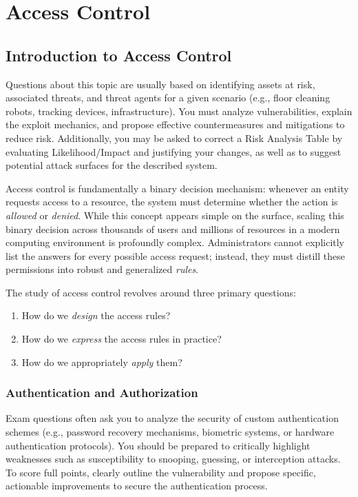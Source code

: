 \chapter{Access Control}
\label{ch:access_control}

\section{Introduction to Access Control}

\begin{tcolorbox}[colback=blue!5!white,colframe=blue!75!black,title=Exam Insight]
Questions about this topic are usually based on identifying assets at risk, associated threats, and threat agents for a given scenario (e.g., floor cleaning robots, tracking devices, infrastructure). You must analyze vulnerabilities, explain the exploit mechanics, and propose effective countermeasures and mitigations to reduce risk. Additionally, you may be asked to correct a Risk Analysis Table by evaluating Likelihood/Impact and justifying your changes, as well as to suggest potential attack surfaces for the described system.
\end{tcolorbox}
Access control is fundamentally a binary decision mechanism: whenever an entity requests access to a resource, the system must determine whether the action is \textit{allowed} or \textit{denied}. While this concept appears simple on the surface, scaling this binary decision across thousands of users and millions of resources in a modern computing environment is profoundly complex. Administrators cannot explicitly list the answers for every possible access request; instead, they must distill these permissions into robust and generalized \textit{rules}.

The study of access control revolves around three primary questions:
\begin{enumerate}
    \item How do we \textit{design} the access rules?
    \item How do we \textit{express} the access rules in practice?
    \item How do we appropriately \textit{apply} them?
\end{enumerate}

\subsection{Authentication and Authorization}

\begin{tcolorbox}[colback=blue!5!white,colframe=blue!75!black,title=Exam Insight]
Exam questions often ask you to analyze the security of custom authentication schemes (e.g., password recovery mechanisms, biometric systems, or hardware authentication protocols). You should be prepared to critically highlight weaknesses such as susceptibility to snooping, guessing, or interception attacks. To score full points, clearly outline the vulnerability and propose specific, actionable improvements to secure the authentication process.
\end{tcolorbox}

